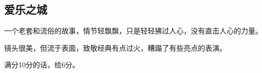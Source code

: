 \subsection{爱乐之城}
一个老套和流俗的故事，情节轻飘飘，只是轻轻拂过人心，没有直击人心的力量。 

镜头很美，但流于表面，致敬经典有点过火，糟蹋了有些亮点的表演。 

满分10分的话，给6分。